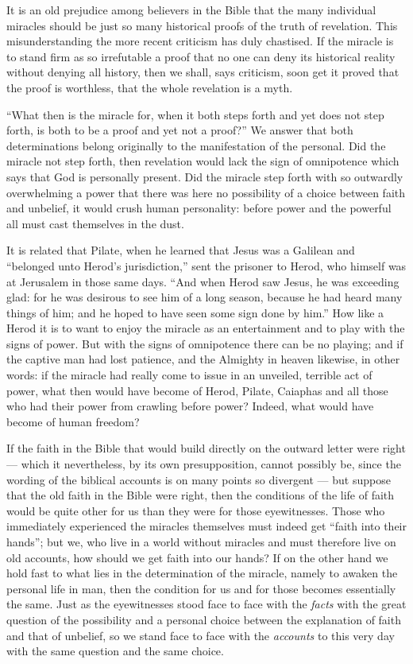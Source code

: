 \documentclass[12pt,a4paper,openany]{book}
\newcommand{\opage}[1]{\marginnote{\footnotesize\textit{[#1]}}}
\begin{document}
\setcounter{footnote}{0}%
\opage{78}It is an old prejudice among believers in the Bible that the many individual miracles should
be just so many historical proofs of the truth of revelation. This misunderstanding the more recent
criticism has duly chastised. If the miracle is to stand firm as so irrefutable a proof that no one can
deny its historical reality without denying all history, then we shall, says criticism, soon get it
proved that the proof is worthless, that the whole revelation is a myth.

``What then is the miracle for, when it both steps forth and yet does not step forth, is both to be a
proof and yet not a proof?'' We answer that both determinations belong originally to the manifestation
of the personal. Did the miracle not step forth, then revelation would lack the sign of omnipotence
which says that God is personally present. Did the miracle step forth with so outwardly overwhelming a
power that there was here no possibility of a choice between faith and unbelief, it would crush human
personality: before power and the powerful all must cast themselves in the dust.

It is related that Pilate, when he learned that Jesus was a Galilean and ``belonged unto Herod's
jurisdiction,'' sent the prisoner to Herod, who himself was at Jerusalem in those same days. ``And when
Herod saw Jesus, he was exceeding glad: for he was desirous to see him of a long season, because he had
heard many things of him; and he hoped to have seen some sign done by him.'' How like a Herod it is to
want to enjoy the miracle as an entertainment and to play with the signs of power. But with the signs
of omnipotence there can be no playing; and if the captive man had lost patience, and the Almighty in
heaven likewise, in other words: if the miracle had really
\setcounter{footnote}{0}%
\opage{79}come to issue in an unveiled, terrible act of power, what then would have become of Herod,
Pilate, Caiaphas and all those who had their power from crawling before power? Indeed, what would have
become of human freedom?

If the faith in the Bible that would build directly on the outward letter were right --- which it
nevertheless, by its own presupposition, cannot possibly be, since the wording of the biblical accounts
is on many points so divergent --- but suppose that the old faith in the Bible were right, then the
conditions of the life of faith would be quite other for us than they were for those eyewitnesses.
Those who immediately experienced the miracles themselves must indeed get ``faith into their hands'';
but we, who live in a world without miracles and must therefore live on old accounts, how should we get
faith into our hands? If on the other hand we hold fast to what lies in the determination of the
miracle, namely to awaken the personal life in man, then the condition for us and for those becomes
essentially the same. Just as the eyewitnesses stood face to face with the \emph{facts} with the great
question of the possibility and a personal choice between the explanation of faith and that of
unbelief, so we stand face to face with the \emph{accounts} to this very day with the same question
and the same choice.
\end{document}
